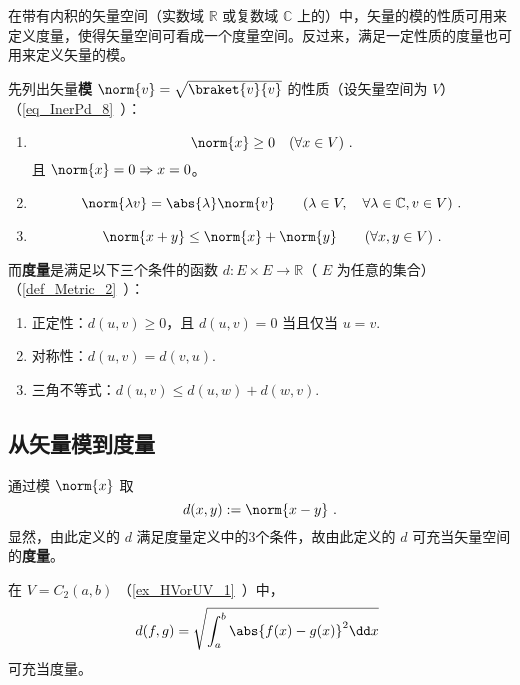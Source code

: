 

在带有内积的矢量空间（实数域 $\mathbb R$ 或复数域 $\mathbb C$ 上的）中，矢量的模的性质可用来定义度量，使得矢量空间可看成一个度量空间。反过来，满足一定性质的度量也可用来定义矢量的模。

先列出矢量\textbf{模} $\norm{v}=\sqrt{\braket{v}{v}}$ 的性质（设矢量空间为 $V$）（\autoref{eq_InerPd_8}~）：
\begin{enumerate}
\item 
\begin{equation}\label{eq_SNadM_1}
\norm{x}\geq 0\quad (\forall x\in V)~.
\end{equation}
且 $\norm{x}=0\Rightarrow x=0$。
\item \begin{equation}\label{eq_SNadM_2}
\norm{\lambda v}=\abs{\lambda}\norm{v}\qquad (\lambda\in V,\quad\forall\lambda\in\mathbb C,v\in V)~.
\end{equation}
\item 
\begin{equation}
\norm{x+y}\leq\norm{x}+\norm{y}\qquad (\forall x,y\in V)~.
\end{equation}
\end{enumerate}

而\textbf{度量}是满足以下三个条件的函数 $d:E\times E\rightarrow\mathbb R$（ $E$ 为任意的集合）（\autoref{def_Metric_2}~）：
\begin{enumerate}
\item 正定性：$d(u, v) \geq 0$，且 $d(u, v)=0$ 当且仅当 $u=v$.
\item 对称性：$d(u, v) = d(v, u)$.
\item 三角不等式：$d(u, v) \leqslant d(u, w) + d(w, v)$.
\end{enumerate}
\subsection{从矢量模到度量}
通过模 $\norm{x}$ 取
\begin{equation}
d(x,y):=\norm{x-y}~.
\end{equation}
显然，由此定义的 $d$ 满足度量定义中的3个条件，故由此定义的 $d$ 可充当矢量空间的\textbf{度量}。
\begin{example}{}
在 $V=C_2(a,b)$ （\autoref{ex_HVorUV_1}~）中，
\begin{equation}
d(f,g)=\sqrt{\int_a^b\abs{f(x)-g(x)}^2\dd x}~
\end{equation}
可充当度量。
\end{example}
